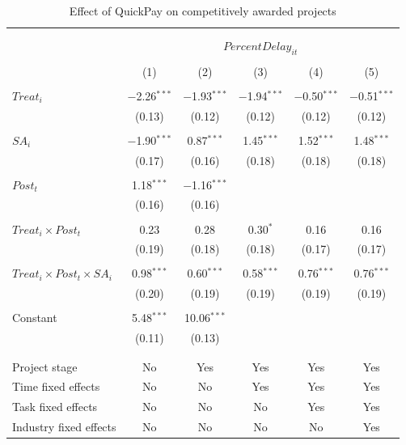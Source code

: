 \documentclass[
]{article}
\begin{document}
\begin{table}[H] \centering 
  \caption{Effect of QuickPay on competitively awarded projects} 
  \label{} 
\small 
\begin{tabular}{@{\extracolsep{-2pt}}lccccc} 
\\[-1.8ex]\hline 
\hline \\[-1.8ex] 
\\[-1.8ex] & \multicolumn{5}{c}{$PercentDelay_{it}$  } \\ 
\\[-1.8ex] & (1) & (2) & (3) & (4) & (5)\\ 
\hline \\[-1.8ex] 
 $Treat_i$ & $-$2.26$^{***}$ & $-$1.93$^{***}$ & $-$1.94$^{***}$ & $-$0.50$^{***}$ & $-$0.51$^{***}$ \\ 
  & (0.13) & (0.12) & (0.12) & (0.12) & (0.12) \\ 
  & & & & & \\ 
 $SA_i$ & $-$1.90$^{***}$ & 0.87$^{***}$ & 1.45$^{***}$ & 1.52$^{***}$ & 1.48$^{***}$ \\ 
  & (0.17) & (0.16) & (0.18) & (0.18) & (0.18) \\ 
  & & & & & \\ 
 $Post_t$ & 1.18$^{***}$ & $-$1.16$^{***}$ &  &  &  \\ 
  & (0.16) & (0.16) &  &  &  \\ 
  & & & & & \\ 
 $Treat_i \times Post_t$ & 0.23 & 0.28 & 0.30$^{*}$ & 0.16 & 0.16 \\ 
  & (0.19) & (0.18) & (0.18) & (0.17) & (0.17) \\ 
  & & & & & \\ 
 $Treat_i \times Post_t \times SA_i $ & 0.98$^{***}$ & 0.60$^{***}$ & 0.58$^{***}$ & 0.76$^{***}$ & 0.76$^{***}$ \\ 
  & (0.20) & (0.19) & (0.19) & (0.19) & (0.19) \\ 
  & & & & & \\ 
 Constant & 5.48$^{***}$ & 10.06$^{***}$ &  &  &  \\ 
  & (0.11) & (0.13) &  &  &  \\ 
  & & & & & \\ 
\hline \\[-1.8ex] 
Project stage & No & Yes & Yes & Yes & Yes \\ 
Time fixed effects & No & No & Yes & Yes & Yes \\ 
Task fixed effects & No & No & No & Yes & Yes \\ 
Industry fixed effects & No & No & No & No & Yes \\ 

\end{tabular}
\end{table}
\end{document}

